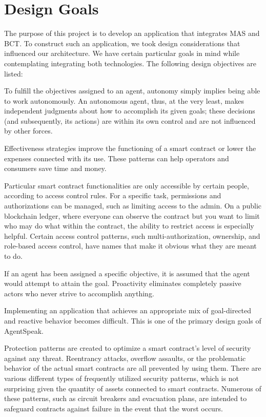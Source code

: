 \section{Design Goals}

The purpose of this project is to develop an application that integrates \ac{MAS} and \ac{BCT}. To construct such an application, we took design considerations that influenced our architecture. We have certain particular goals in mind while contemplating integrating both technologies. The following design objectives are listed:

\begin{itemize}

    To fulfill the objectives assigned to an agent, autonomy simply implies being able to work autonomously. An autonomous agent, thus, at the very least, makes independent judgments about how to accomplish its given goals; these decisions (and subsequently, its actions) are within its own control and are not influenced by other forces.
    
    Effectiveness strategies improve the functioning of a smart contract or lower the expenses connected with its use. These patterns can help operators and consumers save time and money.
    
    Particular smart contract functionalities are only accessible by certain people, according to access control rules. For a specific task, permissions and authorizations can be managed, such as limiting access to the admin. On a public blockchain ledger, where everyone can observe the contract but you want to limit who may do what within the contract, the ability to restrict access is especially helpful. Certain access control patterns, such multi-authorization, ownership, and role-based access control, have names that make it obvious what they are meant to do.
    
    If an agent has been assigned a specific objective, it is assumed that the agent would attempt to attain the goal. Proactivity eliminates completely passive actors who never strive to accomplish anything.

    Implementing an application that achieves an appropriate mix of goal-directed and reactive behavior becomes difficult. This is one of the primary design goals of AgentSpeak.
    
    Protection patterns are created to optimize a smart contract's level of security against any threat. Reentrancy attacks, overflow assaults, or the problematic behavior of the actual smart contracts are all prevented by using them. There are various different types of frequently utilized security patterns, which is not surprising given the quantity of assets connected to smart contracts. Numerous of these patterns, such as circuit breakers and evacuation plans, are intended to safeguard contracts against failure in the event that the worst occurs.
\end{itemize}

